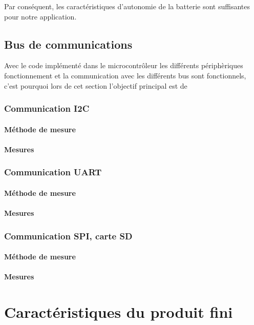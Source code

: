 Par conséquent, les caractéristiques d'autonomie de la batterie sont suffisantes pour notre application. 

\subsection{Bus de communications}
Avec le code implémenté dans le microcontrôleur les différents périphèriques fonctionnement et la communication avec les différents bus sont fonctionnels, c'est pourquoi lors de cet section l'objectif principal est de  

\subsubsection{Communication I2C} \label{ssec:Comm-I2C}
\paragraph{Méthode de mesure}
\paragraph{Mesures}

\subsubsection{Communication UART} \label{ssec:Comm-UART}
\paragraph{Méthode de mesure}
\paragraph{Mesures}

\subsubsection{Communication SPI, carte SD} \label{ssec:Comm-SPI}
\paragraph{Méthode de mesure}
\paragraph{Mesures}

\section{Caractéristiques du produit fini} \label{sec:Carac-finis}